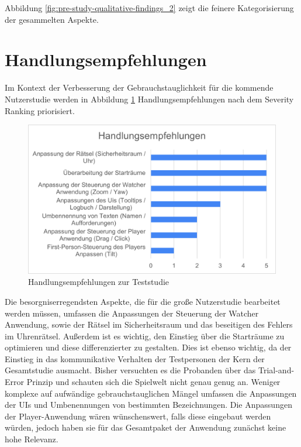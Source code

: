 Abbildung \ref{fig:pre-study-qualitative-findings_2} zeigt die feinere Kategorisierung der gesammelten Aspekte.

\section{Handlungsempfehlungen}
Im Kontext der Verbesserung der Gebrauchstauglichkeit für die kommende Nutzerstudie werden in Abbildung \ref{fig:handlungsempfehlungen-vorstudie} Handlungsempfehlungen nach dem Severity Ranking priorisiert.

\begin{figure}[ht]
\centering
\includegraphics[width=1\linewidth]{content/pictures/Handlungsempfehlung_Vorstudie.png}
\caption{Handlungsempfehlungen zur Teststudie}
\label{fig:handlungsempfehlungen-vorstudie}
\end{figure}


Die besorgniserregendsten Aspekte, die für die große Nutzerstudie bearbeitet werden müssen, umfassen die Anpassungen der Steuerung der Watcher Anwendung, sowie der Rätsel im Sicherheitsraum und das beseitigen des Fehlers im Uhrenrätsel. Außerdem ist es wichtig, den Einstieg über die Starträume zu optimieren und diese differenzierter zu gestalten. Dies ist ebenso wichtig, da der Einstieg in das kommunikative Verhalten der Testpersonen der Kern der Gesamtstudie ausmacht. Bisher versuchten es die Probanden über das Trial-and-Error Prinzip und schauten sich die Spielwelt nicht genau genug an. Weniger komplexe auf aufwändige gebrauchstauglichen Mängel umfassen die Anpassungen der \ac{UI}s und Umbenennungen von bestimmten Bezeichnungen. Die Anpassungen der Player-Anwendung wären wünschenswert, falls diese eingebaut werden würden, jedoch haben sie für das Gesamtpaket der Anwendung zunächst keine hohe Relevanz.

